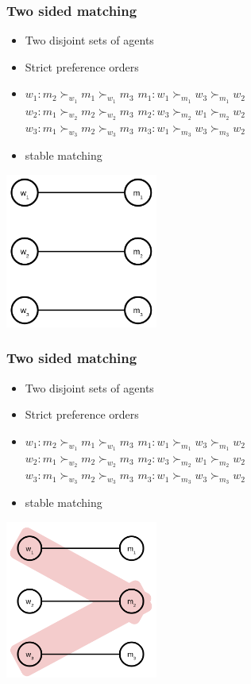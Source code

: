 \begin{frame} 
\frametitle{Two sided matching}
\begin{itemize}[<+->]
    \item Two disjoint sets of agents
    \item Strict preference orders  
    \item $w_1: m_2 \succ_{w_1} m_1 \succ_{w_1} m_3$ \tab $m_1: w_1 \succ_{m_1} w_3 \succ_{m_1} w_2$ \\
    $w_2: m_1 \succ_{w_2} m_2 \succ_{w_2} m_3$ \tab $m_2: w_3 \succ_{m_2} w_1 \succ_{m_2} w_2$ \\
    $w_3: m_1 \succ_{w_3} m_2 \succ_{w_3} m_3$ \tab $m_3: w_1 \succ_{m_3} w_3 \succ_{m_3} w_2$
    \item stable matching
\end{itemize}
\centering
\includegraphics[width=5cm]{img/matching/unstable_matching.png}
\end{frame}

\begin{frame} 
\frametitle{Two sided matching}
\begin{itemize}
    \item Two disjoint sets of agents
    \item Strict preference orders 
    \item $w_1: m_2 \succ_{w_1} m_1 \succ_{w_1} m_3$ \tab $m_1: w_1 \succ_{m_1} w_3 \succ_{m_1} w_2$ \\
    $w_2: m_1 \succ_{w_2} m_2 \succ_{w_2} m_3$ \tab $m_2: w_3 \succ_{m_2} w_1 \succ_{m_2} w_2$ \\
    $w_3: m_1 \succ_{w_3} m_2 \succ_{w_3} m_3$ \tab $m_3: w_1 \succ_{m_3} w_3 \succ_{m_3} w_2$
    \item stable matching
\end{itemize}
\centering
\includegraphics[width=5cm]{img/matching/blockingpairs.png}
\end{frame}


